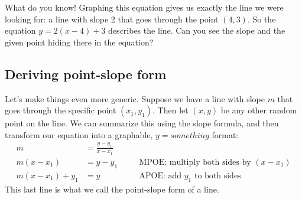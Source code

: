 \begin{center}
\end{center}
%

What do you know! Graphing this equation gives us exactly the line we were looking for: a line with slope 2 that goes through the point $(4,3)$. So the equation $y=2(x-4)+3$ describes the line. Can you see the slope and the given point hiding there in the equation?

\subsection{Deriving point-slope form}

Let's make things even more generic. Suppose we have a line with slope $m$ that goes through the specific point $(x_1, y_1)$. Then let $(x,y)$ be any other random point on the line. We can summarize this using the slope formula, and then transform our equation into a graphable, $y=something$ format:
\[\begin{aligned}
m &= \frac{y-y_1}{x-x_1}
\\
m(x-x_1) &= y-y_1
&& \quad\text{MPOE: multiply both sides by $(x-x_1)$}
\\
m(x-x_1)+y_1 &= y
&& \quad\text{APOE: add $y_1$ to both sides}
\end{aligned}\]
This last line is what we call the \gls{point-slope form} of a line.

